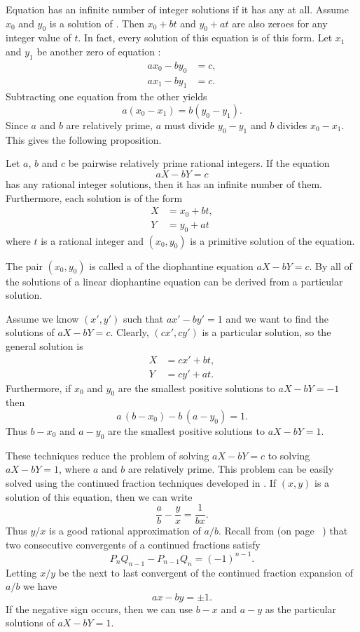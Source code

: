 Equation  has an infinite number of integer
solutions if it has any at all.  Assume $x_0$ and $y_0$ is a solution
of .  Then $x_0 + bt$ and $y_0 + at$ are also
zeroes for any integer value of $t$.  In fact, every solution of this
equation is of this form.  Let $x_1$ and $y_1$ be another zero of
equation :
\[
\begin{aligned}
a x_0 - b y_0 &= c,\\ a x_1 - b y_1 &= c.
\end{aligned}
\]
Subtracting one equation from the other yields
\[
a (x_0 - x_1) = b (y_0 - y_1).
\]
Since $a$ and $b$ are relatively prime, $a$ must divide $y_0 - y_1$
and $b$ divides $x_0 - x_1$.  This gives the following proposition.

\begin{proposition}\label{Dio:2Linear:Prop}
Let $a$, $b$ and $c$ be pairwise relatively prime rational integers.
If the equation 
\[
a X - b Y = c
\]
has any rational integer solutions, then it has an infinite number of
them.  Furthermore, each solution is of the form
\[
\begin{aligned}
X &= x_0 + bt,\\ Y &= y_0 + at
\end{aligned}
\]
where $t$ is a rational integer and $(x_0, y_0)$ is a primitive
solution of the equation.
\end{proposition}

The pair $(x_0, y_0)$ is called a  of the
diophantine equation $a X -b Y = c$.  By 
all of the solutions of a linear diophantine equation can be derived
from a particular solution.

Assume we know $(x', y')$ such that $ax' - by' = 1$ and we want to
find the solutions of $a X - b Y=c$.  Clearly, $(cx', cy')$ is a
particular solution, so the general solution is
\[
\begin{aligned}
X &= cx' + bt,\\ Y &= cy' + at.
\end{aligned}
\]
Furthermore, if $x_0$ and $y_0$ are the smallest positive solutions to
$a X - b Y = -1$ then
\[
a\,(b-x_0) - b\,(a-y_0) = 1.
\]
Thus $b-x_0$ and $a-y_0$ are the smallest positive solutions to $a X
-b Y = 1$.

These techniques reduce the problem of solving $a X - b Y = c$ to solving
$a X-bY=1$, where $a$ and $b$ are relatively prime. This problem can be
easily solved using the continued fraction techniques developed in
.  If $(x, y)$ is a solution of this equation, then
we can write
\[
\frac{a}{b} - \frac{y}{x} = \frac{1}{bx}.
\]
Thus $y/x$ is a good rational approximation of $a/b$.  Recall from
 (on page~ \pageref{CFUnitIdentity:Eq}) that
two consecutive convergents of a continued fractions satisfy
\[
P_n Q_{n-1} - P_{n-1} Q_n = (-1)^{n-1}.
\]
Letting $x/y$ be the next to last convergent of the continued
fraction expansion of $a/b$ we have
\[
ax - by = \pm 1.
\]
If the negative sign occurs, then we can use $b-x$ and $a-y$ as the
particular solutions of $a X - b Y=1$.

